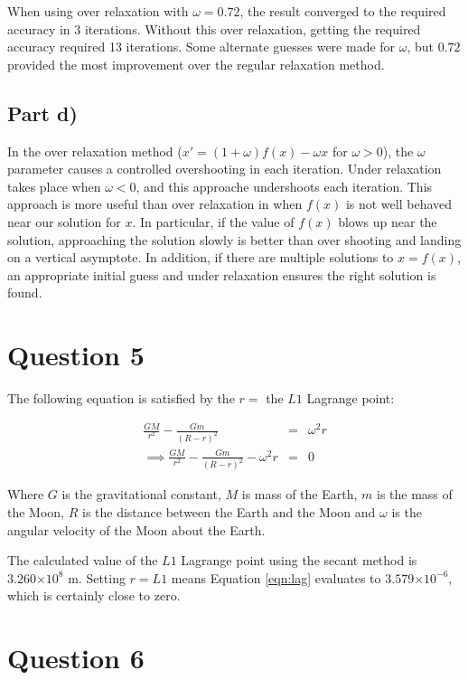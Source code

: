 \documentclass[a4paper,12pt]{article}
\providecommand{\e}[1]{\ensuremath{\times 10^{#1}}}
\begin{document}
When using over relaxation with $\omega = 0.72$, the result converged to the required accuracy in 3 iterations. Without this over relaxation, getting the required accuracy required 13 iterations. Some alternate guesses were made for $\omega$, but $0.72$ provided the most improvement over the regular relaxation method.

\subsection{Part d)}

In the over relaxation method ($x' = (1+\omega)f(x) - \omega x$ for $\omega > 0$), the $\omega$ parameter causes a controlled overshooting in each iteration. Under relaxation takes place when $\omega < 0$, and this approache undershoots each iteration. This approach is more useful than over relaxation in when $f(x)$ is not well behaved near our solution for $x$. In particular, if the value of $f(x)$ blows up near the solution, approaching the solution slowly is better than over shooting and landing on a vertical asymptote. In addition, if there are multiple solutions to $x = f(x)$, an appropriate initial guess and under relaxation ensures the right solution is found.


\section{Question 5}

The following equation is satisfied by the $r =$ the $L1$ Lagrange point:

\begin{eqnarray}
\frac{GM}{r^2} - \frac{Gm}{(R-r)^2} &=& \omega^2r\nonumber\\
\implies \frac{GM}{r^2} - \frac{Gm}{(R-r)^2} - \omega^2r &=& 0
\label{eqn:lag}
\end{eqnarray}

Where $G$ is the gravitational constant, $M$ is mass of the Earth, $m$ is the mass of the Moon, $R$ is the distance between the Earth and the Moon and $\omega$ is the angular velocity of the Moon about the Earth.

The calculated value of the $L1$ Lagrange point using the secant method is $3.260\e{8}$ m. Setting $r = L1$ means Equation \ref{eqn:lag} evaluates to $3.579\e{-6}$, which is certainly close to zero.

\section{Question 6}
\end{document}
